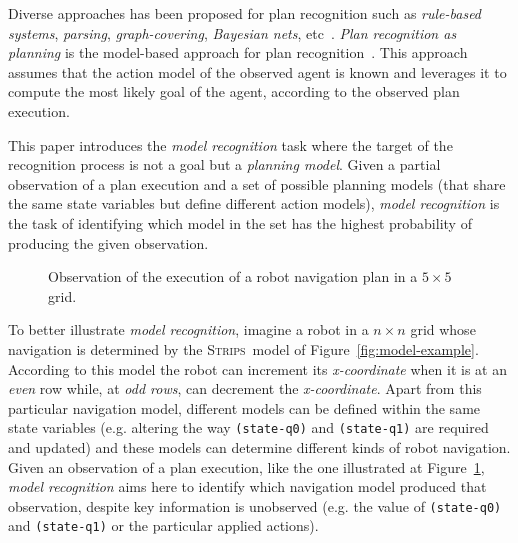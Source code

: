 \documentclass[letterpaper]{article} %
\newcommand{\strips}{\textsc{Strips}}     %
\begin{document}
Diverse approaches has been proposed for plan recognition such as {\em rule-based systems}, {\em parsing}, {\em graph-covering}, {\em Bayesian nets}, etc~\cite{carberry2001techniques,sukthankar2014plan}. {\em Plan recognition as planning} is the model-based approach for plan recognition~\cite{ramirez2012plan,ramirez2009plan}. This approach assumes that the action model of the observed agent is known and leverages it to compute the most likely goal of the agent, according to the observed plan execution.

This paper introduces the {\em model recognition} task where the target of the recognition process is not a goal but a {\em planning model}. Given a partial observation of a plan execution and a set of possible planning models (that share the same state variables but define different action models), {\em model recognition} is the task of identifying which model in the set has the highest probability of producing the given observation.

\begin{figure}
  \begin{scriptsize}
  \begin{center}
  \end{center}
  \end{scriptsize}  
 \caption{\small Observation of the execution of a robot navigation plan in a $5\times 5$ grid.}
\label{fig:grid-example}
\end{figure}

To better illustrate {\em model recognition}, imagine a robot in a $n\times n$ grid whose navigation is determined by the \strips\ model of Figure~\ref{fig:model-example}. According to this model the robot can increment its {\em x-coordinate} when it is at an {\em even} row while, at {\em odd rows}, can decrement the {\em x-coordinate}. Apart from this particular navigation model, different models can be defined within the same state variables (e.g. altering the way {\small\tt (state-q0)} and {\small\tt (state-q1)} are required and updated) and these models can determine different kinds of robot navigation. Given an observation of a plan execution, like the one illustrated at Figure~\ref{fig:grid-example}, {\em model recognition} aims here to identify which navigation model produced that observation, despite key information is unobserved (e.g. the value of {\small\tt (state-q0)} and {\small\tt (state-q1)} or the particular applied actions). 
\end{document}
